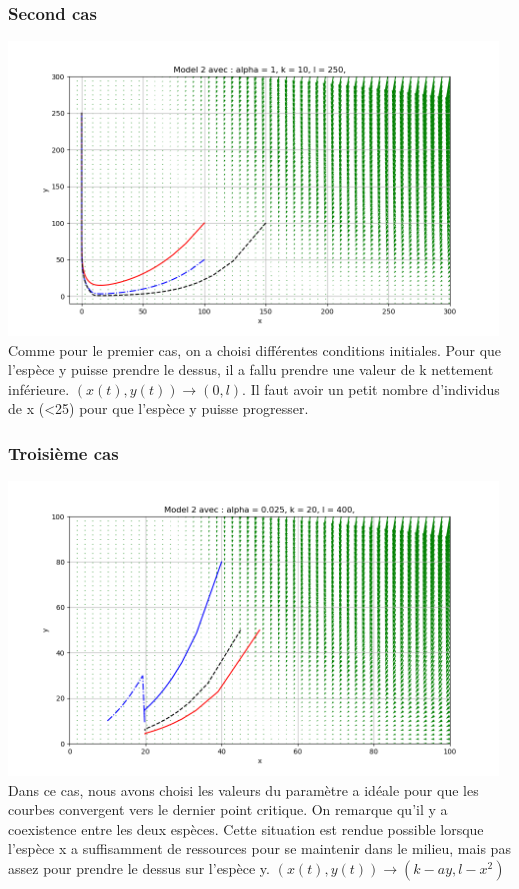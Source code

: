 \documentclass{article}
\begin{document}
\subsubsection{Second cas}
\includegraphics[width = 13cm]{../img/y_predom2.png}\\
Comme pour le premier cas, on a choisi différentes conditions initiales. Pour que l'espèce y puisse prendre le dessus, il a fallu prendre une valeur de k nettement inférieure. $(x(t),y(t)) \longrightarrow (0,l) $. Il faut avoir un petit nombre d'individus de x (<25) pour que l'espèce y puisse progresser.

\subsubsection{Troisième cas}
\includegraphics[width = 13cm]{../img/point_stable3.png}\\
Dans ce cas, nous avons choisi les valeurs du paramètre a idéale pour que les courbes convergent vers le dernier point critique. On remarque qu'il y a coexistence entre les deux espèces. Cette situation est rendue possible lorsque l'espèce x a suffisamment de ressources pour se maintenir dans le milieu, mais pas assez pour prendre le dessus sur l'espèce y. $(x(t),y(t)) \longrightarrow (k-ay,l-x^2)$
\end{document}
